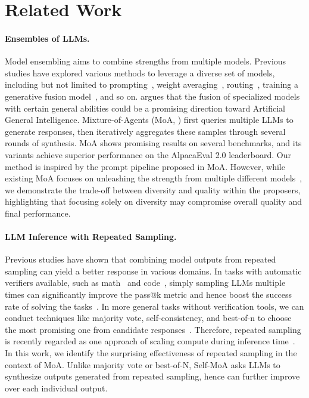 \section{Related Work}
\label{sect:related_work}

\paragraph{Ensembles of LLMs.} 
Model ensembling aims to combine strengths from multiple models. Previous studies have explored various methods to leverage a diverse set of models, including but not limited to prompting~\citep{wang2024mixture}, 
weight averaging~\citep{lin2024mitigatingalignmenttaxrlhf,ramé2024warpbenefitsweightaveraged}, routing~\citep{jiang2024mixtralexperts,lu2023routingexpertefficientrewardguided}, training a generative fusion model~\citep{jiang2023llmblenderensemblinglargelanguage}, and so on. \citet{zhang2024towards} argues that the fusion of specialized models with certain general abilities could be a promising direction toward Artificial General Intelligence. 
Mixture-of-Agents (MoA, \citet{wang2024mixture}) first queries multiple LLMs to generate responses, then iteratively aggregates these samples through several rounds of synthesis. MoA shows promising results on several benchmarks, and its variants achieve superior performance on the AlpacaEval 2.0 leaderboard. 
Our method is inspired by the prompt pipeline proposed in MoA. However, while existing MoA focuses on unleashing the strength from multiple different models~\citep{wang2024mixture,jiang2023llmblenderensemblinglargelanguage, zhang2024diversity}, we demonstrate the trade-off between diversity and quality within the proposers, highlighting that focusing solely on diversity may compromise overall quality and final performance.

\paragraph{LLM Inference with Repeated Sampling.}
Previous studies have shown that combining model outputs from repeated sampling can yield a better response in various domains. In tasks with automatic verifiers available, such as math~\citep{hendrycks2021measuring} and code~\citep{chen2021evaluating}, simply sampling LLMs multiple times can significantly improve the pass@k metric and hence boost the success rate of solving the tasks~\citep{roziere2023code,li2022competition,brown2024large}. In more general tasks without verification tools, we can conduct techniques like majority vote, self-consistency, and best-of-n to choose the most promising one from candidate responses~\citep{wang2022self,chen2023universal,gui2024bonbon,li2024agentsneed}.
Therefore, repeated sampling is recently regarded as one approach of scaling compute during inference time~\citep{brown2024large}.
In this work, we identify the surprising effectiveness of repeated sampling in the context of MoA. Unlike majority vote or best-of-N, Self-MoA asks LLMs to synthesize outputs generated from repeated sampling, hence can further improve over each individual output.

